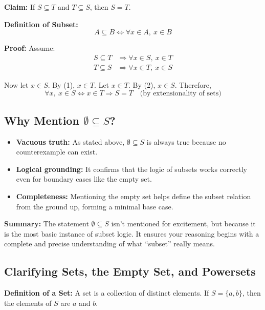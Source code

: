 \documentclass[10pt]{article}
\theoremstyle{plain}
\theoremstyle{definition}
\begin{document}
	\textbf{Claim:} If \( S \subseteq T \) and \( T \subseteq S \), then \( S = T \).
	
	\textbf{Definition of Subset:}  
	\[
	A \subseteq B \iff \forall x \in A,\ x \in B
	\]
	
	\textbf{Proof:}  
	Assume:
	\begin{align*}
		S \subseteq T &\Rightarrow \forall x \in S,\ x \in T \tag{1} \\
		T \subseteq S &\Rightarrow \forall x \in T,\ x \in S \tag{2}
	\end{align*}
	
	Now let \( x \in S \). By (1), \( x \in T \).  
	Let \( x \in T \). By (2), \( x \in S \).  
	Therefore,
	\[
	\forall x,\ x \in S \iff x \in T
	\Rightarrow S = T \quad \text{(by extensionality of sets)}
	\]

	
	\subsection*{Why Mention \( \emptyset \subseteq S \)?}
	
	\begin{itemize}
		\item \textbf{Vacuous truth:}  
		As stated above, \( \emptyset \subseteq S \) is always true because no counterexample can exist.
		
		\item \textbf{Logical grounding:}  
		It confirms that the logic of subsets works correctly even for boundary cases like the empty set.
		
		\item \textbf{Completeness:}  
		Mentioning the empty set helps define the subset relation from the ground up, forming a minimal base case.
	\end{itemize}
	
	\textbf{Summary:}  
	The statement \( \emptyset \subseteq S \) isn’t mentioned for excitement, but because it is the most basic instance of subset logic. It ensures your reasoning begins with a complete and precise understanding of what ``subset'' really means.
	
	\subsection*{Clarifying Sets, the Empty Set, and Powersets}
	
	\textbf{Definition of a Set:} A set is a collection of distinct elements. If \( S = \{a, b\} \), then the elements of \( S \) are \( a \) and \( b \).
	
\end{document}
